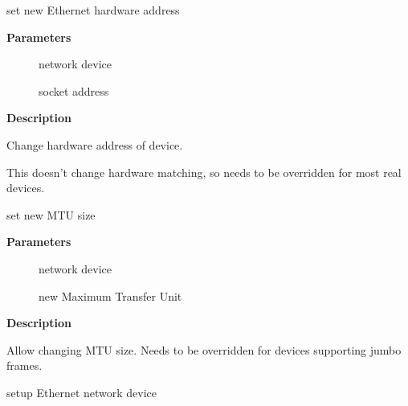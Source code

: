 \documentclass[a4paper,8pt,english]{sphinxmanual}
\begin{document}
\begin{fulllineitems}
\label{networking/kapi:c.eth_mac_addr}
set new Ethernet hardware address

\end{fulllineitems}


\textbf{Parameters}
\begin{description}
\item[{}] \leavevmode
network device

\item[{}] \leavevmode
socket address

\end{description}

\textbf{Description}

Change hardware address of device.

This doesn't change hardware matching, so needs to be overridden
for most real devices.

\begin{fulllineitems}
\label{networking/kapi:c.eth_change_mtu}
set new MTU size

\end{fulllineitems}


\textbf{Parameters}
\begin{description}
\item[{}] \leavevmode
network device

\item[{}] \leavevmode
new Maximum Transfer Unit

\end{description}

\textbf{Description}

Allow changing MTU size. Needs to be overridden for devices
supporting jumbo frames.

\begin{fulllineitems}
\label{networking/kapi:c.ether_setup}
setup Ethernet network device

\end{fulllineitems}
\end{document}
